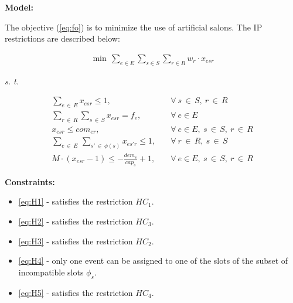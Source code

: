 \documentclass[centering]{report}
\newenvironment{slide}
    {\newpage
    \vspace*{\fill}
    }
    { 
     \vspace*{\fill}
    }
\begin{document}
\begin{slide}
\textbf{Model:}\\

\renewcommand\theequation{\arabic{equation}}


{\LARGE
The objective (\ref{eq:fo}) is to minimize the use of artificial salons. The IP restrictions are described below:

  \begin{align}
    \label{eq:fo} \min \, \sum_{e \in E} \sum_{s \in S} \sum_{r \in R} w_{r} \cdot x_{esr}
  \end{align}
}
\emph{s. t.}

{\LARGE
  \begin{align}
    \label{eq:H1} \sum_{e\,\in\,E}{x_{esr}} \le 1, & \quad \forall \ s\,\in\,S, \ r\,\in \,R \\
    \label{eq:H2} \sum_{r\,\in\,R}{\sum_{s\,\in\,S}{x_{esr}} = f_e}, & \quad \forall \ e\in E \\
    \label{eq:H3} x_{esr}  \le com_{er}, & \quad \forall \ e\in E, \ s\,\in \,S , \ r\,\in \,R \\
    \label{eq:H4} \sum_{e\,\in\,E}{\, \sum_{s'\,\in\,\phi(s)}{x_{es'r}}}  \le 1, & \quad \forall \ r\,\in \,R ,  \ s\,\in \,S \\
    \label{eq:H5} M \cdot ( x_{esr} -1 ) \le -\frac{dem_e}{cap_s} + 1, & \quad \forall \ e\in E, \ s\,\in \,S , \ r\,\in \,R
  \end{align}
}

\end{slide}

\begin{slide}
\textbf{Constraints:}\\

\begin{itemize}
\item \ref{eq:H1} - satisfies the restriction $HC_1$.
\item \ref{eq:H2} - satisfies the restriction $HC_3$.
\item \ref{eq:H3} - satisfies the restriction $HC_2$.
\item \ref{eq:H4} - only one event can be assigned to one of the slots of the subset of incompatible slots $\phi_s$.
\item \ref{eq:H5} - satisfies the restriction $HC_4$.
\end{itemize}

\end{slide}
\end{document}
